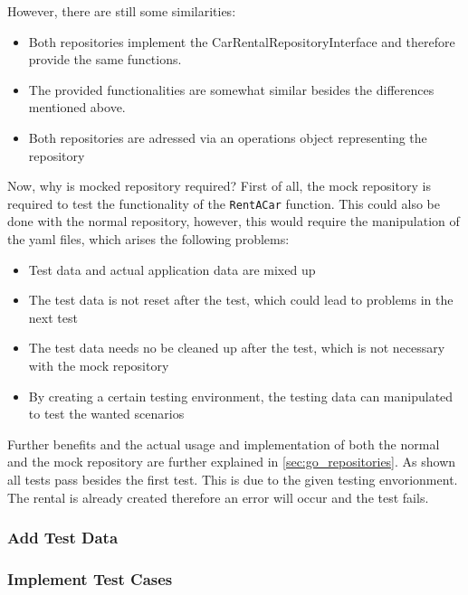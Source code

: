However, there are still some similarities:
\begin{itemize}
      \item Both repositories implement the CarRentalRepositoryInterface and therefore provide the same functions.
      \item The provided functionalities are somewhat similar besides the differences mentioned above.
      \item Both repositories are adressed via an operations object representing the repository
\end{itemize}

Now, why is mocked repository required?
First of all, the mock repository is required to test the functionality of the \texttt{RentACar} function.
This could also be done with the normal repository, however, this would require the manipulation of the yaml files, which arises the following problems:
\begin{itemize}
      \item Test data and actual application data are mixed up
      \item The test data is not reset after the test, which could lead to problems in the next test
      \item The test data needs no be cleaned up after the test, which is not necessary with the mock repository
      \item By creating a certain testing environment, the testing data can manipulated to test the wanted scenarios
\end{itemize}

Further benefits and the actual usage and implementation of both the normal and the mock repository are further explained in \autoref{sec:go_repositories}.
As shown all tests pass besides the first test.
This is due to the given testing envorionment.
The rental is already created therefore an error will occur and the test fails.

\subsubsection*{Add Test Data}

\subsubsection*{Implement Test Cases}

